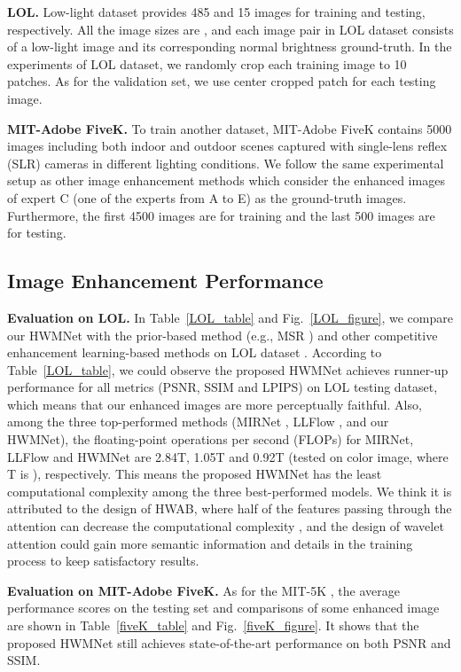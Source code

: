 \documentclass{article}
\begin{document}
\noindent\textbf{LOL.} Low-light dataset \cite{lol} provides 485 and 15 images for training and testing, respectively. All the image sizes are , and each image pair in LOL dataset consists of a low-light image and its corresponding normal brightness ground-truth. In the experiments of LOL dataset, we randomly crop each training image to 10  patches. As for the validation set, we use center cropped  patch for each testing image. 

\noindent\textbf{MIT-Adobe FiveK.} To train another dataset, MIT-Adobe FiveK \cite{fivek} contains 5000 images including both indoor and outdoor scenes captured with single-lens reflex (SLR) cameras in different lighting conditions. We follow the same experimental setup as other image enhancement methods \cite{01} which consider the enhanced images of expert C (one of the  experts from A to E) as the ground-truth images. Furthermore, the first 4500 images are for training and the last 500 images are for testing. 




\subsection{Image Enhancement Performance}
\noindent\textbf{Evaluation on LOL.} In Table~\ref{LOL_table} and Fig.~\ref{LOL_figure}, we compare our HWMNet with the prior-based method (e.g., MSR \cite{MSR}) and other competitive enhancement learning-based methods on LOL dataset \cite{lol}. According to Table~\ref{LOL_table}, we could observe the proposed HWMNet achieves runner-up performance for all metrics (PSNR, SSIM and LPIPS) on LOL testing dataset, which means that our enhanced images are more perceptually faithful. Also, among the three top-performed methods (MIRNet \cite{01}, LLFlow \cite{LLFlow}, and our HWMNet), the floating-point operations per second (FLOPs) for MIRNet, LLFlow and HWMNet are 2.84T, 1.05T and 0.92T (tested on  color image, where T is ), respectively. This means the proposed HWMNet has the least computational complexity among the three best-performed models. We think it is attributed to the design of HWAB, where half of the features passing through the attention can decrease the computational complexity \cite{hinet}, and the design of wavelet attention could gain more semantic information and details in the training process to keep satisfactory results.


\noindent\textbf{Evaluation on MIT-Adobe FiveK.} As for the MIT-5K \cite{fivek}, the average performance scores on the testing set and comparisons of some enhanced image are shown in Table~\ref{fiveK_table} and Fig.~\ref{fiveK_figure}. It shows that the proposed HWMNet still achieves state-of-the-art performance on both PSNR and SSIM. 
\end{document}
